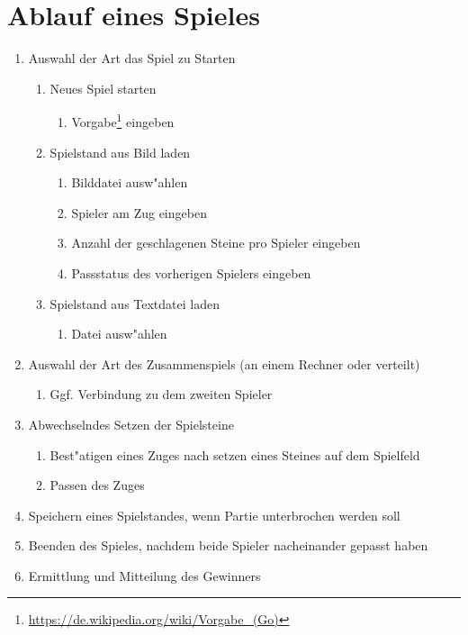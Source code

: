 \documentclass[a4paper]{scrreprt}
\begin{document}
{ \chapter{Ablauf eines Spieles}
 \begin{enumerate}
 \item Auswahl der Art das Spiel zu Starten
 \begin{enumerate}
 \item Neues Spiel starten
  \begin{enumerate}
 \item Vorgabe\footnote{\label{note1}{\url{https://de.wikipedia.org/wiki/Vorgabe_(Go)}}} eingeben
 \end{enumerate} 
 \item Spielstand aus Bild laden
 \begin{enumerate}
 \item Bilddatei ausw"ahlen
 \item Spieler am Zug eingeben
 \item Anzahl der geschlagenen Steine pro Spieler eingeben
 \item Passstatus des vorherigen Spielers eingeben
 \end{enumerate} 
  \item Spielstand aus Textdatei laden
 \begin{enumerate}
 \item Datei ausw"ahlen
 \end{enumerate} 
 \end{enumerate} 
 \item Auswahl der Art des Zusammenspiels (an einem Rechner oder verteilt)
          \begin{enumerate}
      \item Ggf. Verbindung zu dem zweiten Spieler
      \end{enumerate}
  \item Abwechselndes Setzen der Spielsteine
            \begin{enumerate}
  \item Best"atigen eines Zuges nach setzen eines Steines auf dem Spielfeld
    \item Passen des Zuges 
      \end{enumerate}
        \item Speichern eines Spielstandes, wenn Partie unterbrochen werden soll
    \item Beenden des Spieles, nachdem beide Spieler nacheinander gepasst haben
        \item Ermittlung und Mitteilung des Gewinners
    

\end{enumerate}}
\end{document}
